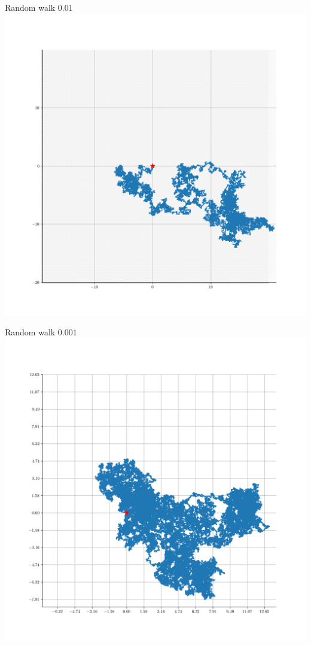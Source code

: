 \documentclass[color=usenames,dvipsnames]{beamer}
\begin{document}
\begin{frame}{Random walk $0.01$}
    \includegraphics[width=0.8\linewidth]{Control_lecture_notes/Figs/rw_2d_100.png}
\end{frame}
\begin{frame}{Random walk $0.001$}
    \includegraphics[width=0.8\linewidth]{Control_lecture_notes/Figs/rw_2d_1000.png}
\end{frame}
\end{document}
